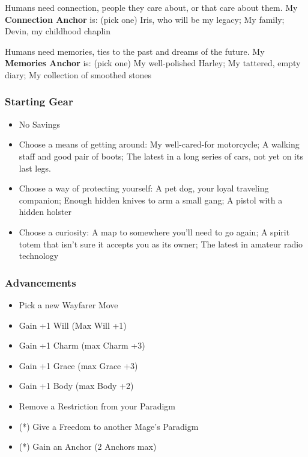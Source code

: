 \documentclass[
]{article}
\providecommand{\tightlist}{%
  \setlength{\itemsep}{0pt}\setlength{\parskip}{0pt}}
\begin{document}
Humans need connection, people they care about, or that care about them.
My \textbf{Connection Anchor} is: (pick one) Iris, who will be my
legacy; My family; Devin, my childhood chaplin

Humans need memories, ties to the past and dreams of the future. My
\textbf{Memories Anchor} is: (pick one) My well-polished Harley; My
tattered, empty diary; My collection of smoothed stones

\hypertarget{starting-gear-8}{%
\subsubsection{Starting Gear}\label{starting-gear-8}}

\begin{itemize}
\tightlist
\item
  No Savings
\item
  Choose a means of getting around: My well-cared-for motorcycle; A
  walking staff and good pair of boots; The latest in a long series of
  cars, not yet on its last legs.
\item
  Choose a way of protecting yourself: A pet dog, your loyal traveling
  companion; Enough hidden knives to arm a small gang; A pistol with a
  hidden holster
\item
  Choose a curiosity: A map to somewhere you'll need to go again; A
  spirit totem that isn't sure it accepts you as its owner; The latest
  in amateur radio technology
\end{itemize}

\hypertarget{advancements-8}{%
\subsubsection{Advancements}\label{advancements-8}}

\begin{itemize}
\tightlist
\item
  Pick a new Wayfarer Move
\item
  Gain +1 Will (Max Will +1)
\item
  Gain +1 Charm (max Charm +3)
\item
  Gain +1 Grace (max Grace +3)
\item
  Gain +1 Body (max Body +2)
\item
  Remove a Restriction from your Paradigm
\item
  (*) Give a Freedom to another Mage's Paradigm
\item
  (*) Gain an Anchor (2 Anchors max)
\end{itemize}
\end{document}
